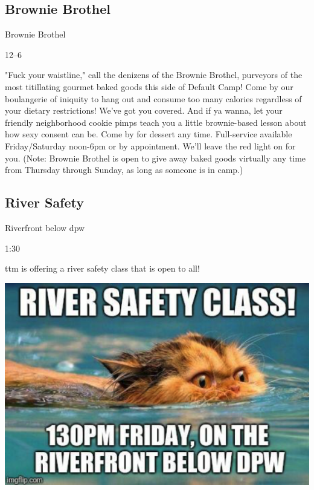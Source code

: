 \begin{multicols}{2}
\subsection*{Brownie Brothel}
\begin{description}[leftmargin=6em,noitemsep,style=nextline]
	\item[Camp:] Brownie Brothel
  \item[Times:] 12--6\pm
\end{description}

"Fuck your waistline," call the denizens of the Brownie Brothel, purveyors of the most titillating gourmet baked goods this side of Default Camp! Come by our boulangerie of iniquity to hang out and consume too many calories regardless of your dietary restrictions! We've got you covered. And if ya wanna, let your friendly neighborhood cookie pimps teach you a little brownie-based lesson about how sexy consent can be. Come by for dessert any time. Full-service available Friday/Saturday noon-6pm or by appointment. We'll leave the red light on for you.
(Note: Brownie Brothel is open to give away baked goods virtually any time from Thursday through Sunday, as long as someone is in camp.)

\subsection*{River Safety}
\begin{description}[leftmargin=6em,noitemsep,style=nextline]
	\item[Location:]  Riverfront below \gls{dpw}
  \item[Times:] 1:30\pm
\end{description}

\Gls{ttm} is offering a river safety class that is open to all!

\includegraphics[width=\columnwidth]{images/riversafety.png}


\end{multicols}
